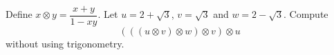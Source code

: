 Define $x\otimes y=\dfrac{x+y}{1-xy}$. Let $u=2+\sqrt3$, $v=\sqrt3$ and $w=2-\sqrt3$. Compute
\[
\left(\left(\left(u\otimes v\right)\otimes w\right)\otimes v\right)\otimes u
\]
without using trigonometry.

